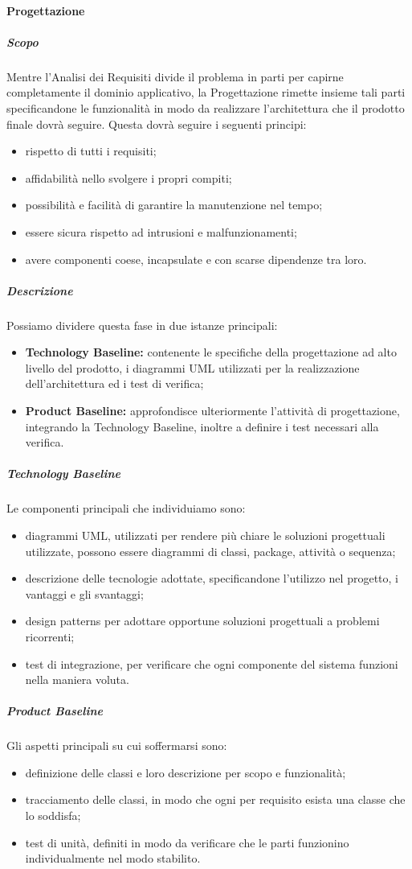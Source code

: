 			\paragraph{Progettazione}
			\subparagraph{Scopo}
			Mentre l'Analisi dei Requisiti divide il problema in parti per capirne completamente il dominio applicativo, la Progettazione rimette insieme tali parti specificandone le funzionalità in modo da realizzare l'architettura che il prodotto finale dovrà seguire. Questa dovrà seguire i seguenti principi:
			\begin{itemize}
				\item rispetto di tutti i requisiti;
				\item affidabilità nello svolgere i propri compiti;
				\item possibilità e facilità di garantire la manutenzione nel tempo;
				\item essere sicura rispetto ad intrusioni e malfunzionamenti;
				\item avere componenti coese, incapsulate e con scarse dipendenze tra loro.
			\end{itemize}
			\subparagraph{Descrizione}
			Possiamo dividere questa fase in due istanze principali:
			\begin{itemize}
				\item \textbf{Technology Baseline:} contenente le specifiche della progettazione ad alto livello del prodotto, i diagrammi UML utilizzati per la realizzazione dell'architettura ed i test di verifica;
				\item \textbf{Product Baseline:} approfondisce ulteriormente l'attività di progettazione, integrando la Technology Baseline, inoltre a definire i test necessari alla verifica.
			\end{itemize}
			\subparagraph{Technology Baseline}
			Le componenti principali che individuiamo sono:
			\begin{itemize}
				\item diagrammi UML, utilizzati per rendere più chiare le soluzioni progettuali utilizzate, possono essere diagrammi di classi, package, attività o sequenza;
				\item descrizione delle tecnologie adottate, specificandone l'utilizzo nel progetto, i vantaggi e gli svantaggi;
				\item design patterns per adottare opportune soluzioni progettuali a problemi ricorrenti;
				\item test di integrazione, per verificare che ogni componente del sistema funzioni nella maniera voluta.
			\end{itemize} 
			\subparagraph{Product Baseline}
			Gli aspetti principali su cui soffermarsi sono:
			\begin{itemize}
				\item definizione delle classi e loro descrizione per scopo e funzionalità;
				\item tracciamento delle classi, in modo che ogni per requisito esista una classe che lo soddisfa;
				\item test di unità, definiti in modo da verificare che le parti funzionino individualmente nel modo stabilito.
			\end{itemize} 
					
